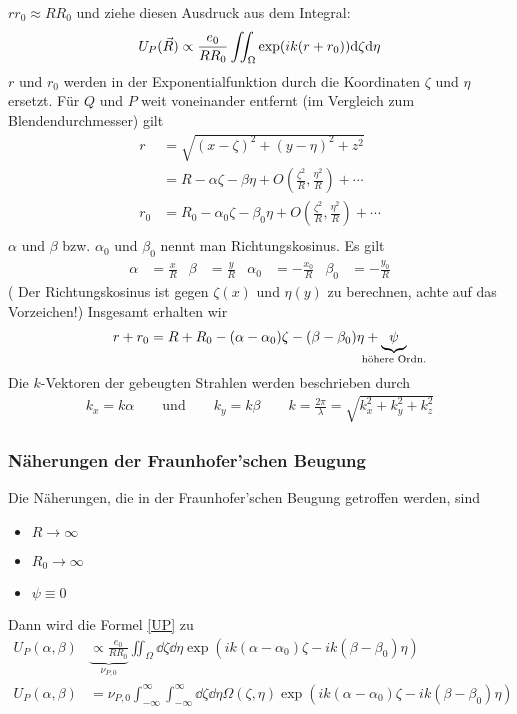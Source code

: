 $rr_0\approx RR_0$ und ziehe diesen Ausdruck aus dem Integral:
\begin{gather*}
  U_P(\vec{R}) \propto \frac{e_0}{RR_0} \iint_{\Omega} 
  \exp(ik(r+r_0)) \mathrm{d}\zeta\mathrm{d}\eta  
  \label{UP}
\end{gather*}
$r$ und $r_0$ werden in der Exponentialfunktion durch die Koordinaten
$\zeta$ und $\eta$ ersetzt.
Für $Q$ und $P$ weit voneinander entfernt (im Vergleich zum
Blendendurchmesser) gilt
\begin{align*}
  r &= \sqrt{(x-\zeta)^2+(y-\eta)^2+z^2} \\
    &= R-\alpha\zeta - \beta\eta 
      + O\left(\frac{\zeta^2}{R},\frac{\eta^2}{R}\right)
      + \dotsb \\
  r_0 &= R_0-\alpha_0\zeta - \beta_0\eta 
        + O\left(\frac{\zeta^2}{R},\frac{\eta^2}{R}\right)
        + \dotsb \\
\end{align*}
$\alpha$ und $\beta$ bzw. $\alpha_0$ und $\beta_0$ nennt man
Richtungskosinus. Es gilt
\begin{align*}
  \alpha &= \frac{x}{R}
  &\beta &= \frac{y}{R}
  &\alpha_0 &= -\frac{x_0}{R}
  &\beta_0 &= -\frac{y_0}{R}
\end{align*}
( Der Richtungskosinus ist gegen $\zeta(x)$ und $\eta(y)$ zu
berechnen, achte auf das Vorzeichen!)
Insgesamt erhalten wir
\begin{align*}
  r+r_0 = R+R_0 - (\alpha-\alpha_0)\zeta - (\beta-\beta_0)\eta 
  + \underbrace{\psi}_{\mathclap{\text{höhere Ordn.}}}
\end{align*}
Die $k$-Vektoren der gebeugten Strahlen werden beschrieben durch
\begin{align*}
  k_x = k\alpha \qquad \text{und}\qquad k_y = k\beta
  \qquad k=\frac{2\pi}{\lambda}=\sqrt{k_x^2+k_y^2+k_z^2}
\end{align*}


\subsubsection{Näherungen der Fraunhofer'schen Beugung}
Die Näherungen, die in der Fraunhofer'schen Beugung getroffen werden,
sind
\begin{itemize}
\item $R\rightarrow\infty$
\item $R_0\rightarrow\infty$
\item $\psi\equiv 0$
\end{itemize}
Dann wird die Formel \eqref{UP} zu
\begin{align*}
  U_P(\alpha,\beta) 
  & \underbrace{\propto \frac{e_0}{RR_0}}_{\nu_{P,0}} 
    \iint_{\Omega} \dd\zeta\dd\eta
    \exp\left( ik(\alpha-\alpha_0)\zeta - ik(\beta-\beta_0)\eta \right)\\
  U_P(\alpha,\beta) 
  &= \nu_{P,0} \int_{-\infty}^{\infty}\int_{-\infty}^{\infty}
    \dd\zeta\dd\eta \Omega(\zeta,\eta)
    \exp\left( ik(\alpha-\alpha_0)\zeta - ik(\beta-\beta_0)\eta \right)
\end{align*}

